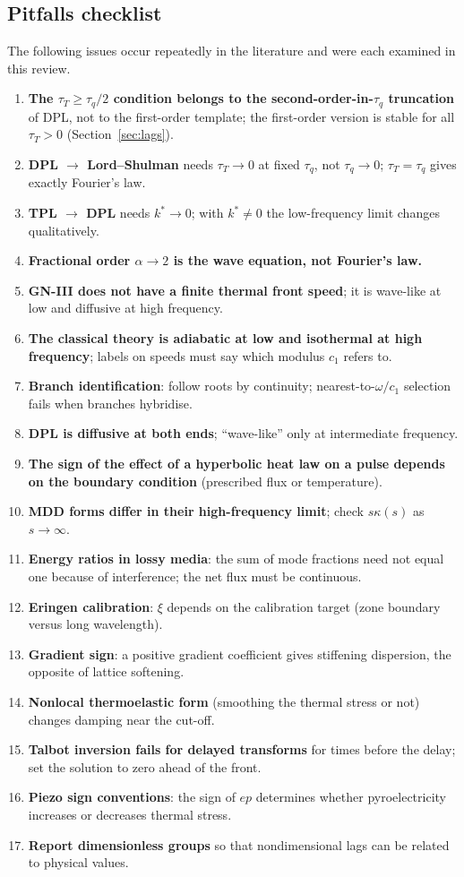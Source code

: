 \subsection{Pitfalls checklist}
The following issues occur repeatedly in the literature and were each examined in this review.
\begin{enumerate}
\item \textbf{The $\tau_T\ge\tau_q/2$ condition belongs to the second-order-in-$\tau_q$ truncation} of DPL, not to the first-order template; the first-order version is stable for all $\tau_T>0$ (Section~\ref{sec:lags}).
\item \textbf{DPL $\to$ Lord--Shulman} needs $\tau_T\to0$ at fixed $\tau_q$, not $\tau_q\to0$; $\tau_T=\tau_q$ gives exactly Fourier's law.
\item \textbf{TPL $\to$ DPL} needs $k^*\to0$; with $k^*\ne0$ the low-frequency limit changes qualitatively.
\item \textbf{Fractional order $\alpha\to2$ is the wave equation, not Fourier's law.}
\item \textbf{GN-III does not have a finite thermal front speed}; it is wave-like at low and diffusive at high frequency.
\item \textbf{The classical theory is adiabatic at low and isothermal at high frequency}; labels on speeds must say which modulus $c_1$ refers to.
\item \textbf{Branch identification}: follow roots by continuity; nearest-to-$\omega/c_1$ selection fails when branches hybridise.
\item \textbf{DPL is diffusive at both ends}; ``wave-like'' only at intermediate frequency.
\item \textbf{The sign of the effect of a hyperbolic heat law on a pulse depends on the boundary condition} (prescribed flux or temperature).
\item \textbf{MDD forms differ in their high-frequency limit}; check $s\kappa(s)$ as $s\to\infty$.
\item \textbf{Energy ratios in lossy media}: the sum of mode fractions need not equal one because of interference; the net flux must be continuous.
\item \textbf{Eringen calibration}: $\xi$ depends on the calibration target (zone boundary versus long wavelength).
\item \textbf{Gradient sign}: a positive gradient coefficient gives stiffening dispersion, the opposite of lattice softening.
\item \textbf{Nonlocal thermoelastic form} (smoothing the thermal stress or not) changes damping near the cut-off.
\item \textbf{Talbot inversion fails for delayed transforms} for times before the delay; set the solution to zero ahead of the front.
\item \textbf{Piezo sign conventions}: the sign of $ep$ determines whether pyroelectricity increases or decreases thermal stress.
\item \textbf{Report dimensionless groups} so that nondimensional lags can be related to physical values.
\end{enumerate}


